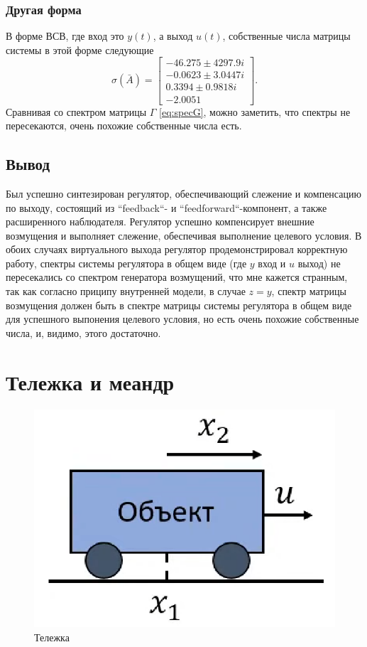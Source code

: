 \subsubsection{Другая форма}

В форме ВСВ, где вход это $y(t)$, а выход $u(t)$,
собственные числа матрицы системы в этой форме следующие
\begin{equation*}
    \sigma(\bar A)=\begin{bmatrix}
        -46.275 \pm 4297.9i \\
        -0.0623 \pm 3.0447i \\
        0.3394 \pm 0.9818i \\
        -2.0051
    \end{bmatrix}.
\end{equation*}
Сравнивая со спектром матрицы $\Gamma$ \eqref{eq:specG}, можно заметить, что
спектры не пересекаются, очень похожие собственные числа есть.



\subsection{Вывод}

Был успешно синтезирован регулятор, обеспечивающий слежение и компенсацию 
по выходу, состоящий из ``feedback``- и ``feedforward``-компонент, 
а также расширенного наблюдателя. Регулятор успешно компенсирует внешние возмущения
и выполняет слежение, обеспечивая выполнение целевого условия. В обоих случаях виртуального 
выхода регулятор продемонстрировал корректную работу, спектры системы
регулятора в общем виде (где $y$ вход и $u$ выход) не пересекались со 
спектром генератора возмущений, что мне кажется странным,
так как согласно приципу внутренней модели, в случае $z=y$, спектр матрицы возмущения
должен быть в спектре матрицы системы регулятора в общем виде для успешного
выпонения целевого условия, но есть очень похожие собственные числа, и, видимо,
этого достаточно.




\section{Тележка и меандр}

\begin{figure}[H]
    \centering
    \includegraphics[width=0.4\linewidth]{figs/тележка.png}
    \caption{Тележка}
    \label{fig:cart}
\end{figure}

